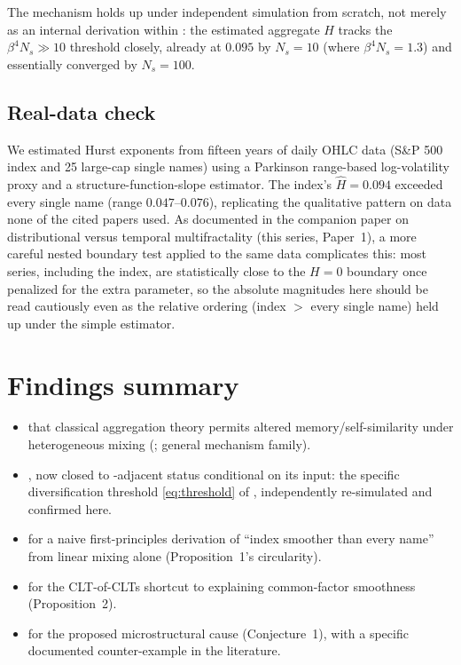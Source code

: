 \documentclass[11pt]{article}
\begin{document}
\begin{finding}
The mechanism holds up under independent simulation from scratch, not merely as an internal derivation within \citet{zarhali2025nested}: the estimated aggregate $H$ tracks the $\beta^4N_s\gg10$ threshold closely, already at $0.095$ by $N_s=10$ (where $\beta^4N_s=1.3$) and essentially converged by $N_s=100$.
\end{finding}

\subsection{Real-data check}

We estimated Hurst exponents from fifteen years of daily OHLC data (S\&P 500 index and 25 large-cap single names) using a Parkinson range-based log-volatility proxy and a structure-function-slope estimator. The index's $\hat H=0.094$ exceeded every single name (range $0.047$--$0.076$), replicating the qualitative pattern on data none of the cited papers used. As documented in the companion paper on distributional versus temporal multifractality (this series, Paper~1), a more careful nested boundary test applied to the same data complicates this: most series, including the index, are statistically close to the $H=0$ boundary once penalized for the extra parameter, so the absolute magnitudes here should be read cautiously even as the relative ordering (index $>$ every single name) held up under the simple estimator.

\section{Findings summary}

\begin{itemize}
\item {} that classical aggregation theory permits altered memory/self-similarity under heterogeneous mixing (\citealp{granger1980long}; general mechanism family).
\item {}, now closed to -adjacent status conditional on its input: the specific diversification threshold \eqref{eq:threshold} of \citet{zarhali2025nested}, independently re-simulated and confirmed here.
\item {} for a naive first-principles derivation of ``index smoother than every name'' from linear mixing alone (Proposition~1's circularity).
\item {} for the CLT-of-CLTs shortcut to explaining common-factor smoothness (Proposition~2).
\item {} for the proposed microstructural cause (Conjecture~1), with a specific documented counter-example in the literature.
\end{itemize}
\end{document}
